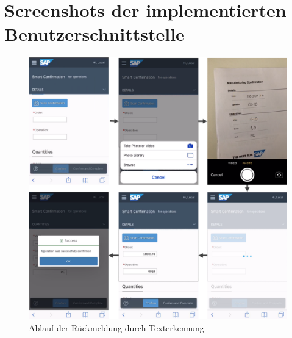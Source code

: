 \chapter{Screenshots der implementierten Benutzerschnittstelle}\label{ah:abbildungen}

\begin{figure}[H]
	\centering 
	\includegraphics[width=\textwidth]{img/ablauf_ocr.png}	
	\caption[Eingabemaske zur Rückmeldung via Texterkennung]{\label{fig:Eingabemaske zur Rückmeldung via Texterkennung}Ablauf der Rückmeldung durch Texterkennung
	}
\end{figure}

